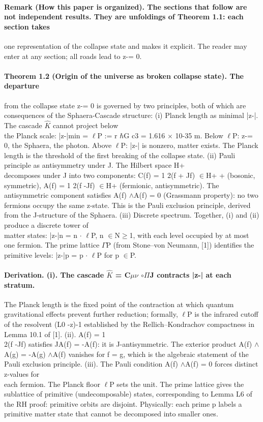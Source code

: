 \paragraph*{Remark (How this paper is organized). The sections that follow are not independent results. They are unfoldings of Theorem 1.1: each section takes}
one representation of the collapse state and makes it explicit. The reader may enter at any section; all roads lead to z-= 0.
\paragraph*{Theorem 1.2 (Origin of the universe as broken collapse state). The departure}
from the collapse state z-= 0 is governed by two principles, both of which are consequences of the Sphaera-Cascade structure:
(i) Planck length as minimal |z-|. The cascade $\hat K$ cannot project below\\
the Planck scale: |z-|min = $\ell$P := r $\hbar$G c3 = 1.616 $\times$ 10-35 m. Below $\ell$P: z-= 0, the Sphaera, the photon. Above $\ell$P: |z-| is nonzero, matter exists. The Planck length is the threshold of the first breaking of the collapse state.
(ii) Pauli principle as antisymmetry under J. The Hilbert space H+\\
decomposes under J into two components: C(f) = 1 2(f + Jf) $\in$H+ + (bosonic, symmetric), A(f) = 1 2(f -Jf) $\in$H+ (fermionic, antisymmetric). The antisymmetric component satisfies A(f) $\wedge$A(f) = 0 (Grassmann property): no two fermions occupy the same z-state. This is the Pauli exclusion principle, derived from the J-structure of the Sphaera.
(iii) Discrete spectrum. Together, (i) and (ii) produce a discrete tower of\\
matter states: |z-|n = n $\cdot$ $\ell$P, n $\in$N$\geq$1, with each level occupied by at most one fermion. The prime lattice $\Gamma$P (from Stone--von Neumann, [1]) identifies the primitive levels: |z-|p = p $\cdot$ $\ell$P for p $\in$P.
\paragraph*{Derivation. (i). The cascade $\hat K$ = C$\mu$$\nu$ $\circ$$\Pi$J contracts |z-| at each stratum.}
The Planck length is the fixed point of the contraction at which quantum gravitational effects prevent further reduction; formally, $\ell$P is the infrared cutoff of the resolvent (L0 -z)-1 established by the Rellich--Kondrachov compactness in Lemma 10.1 of [1].
(ii). A(f) = 1\\
2(f -Jf) satisfies JA(f) = -A(f): it is J-antisymmetric. The exterior product A(f) $\wedge$A(g) = -A(g) $\wedge$A(f) vanishes for f = g, which is the algebraic statement of the Pauli exclusion principle.
(iii). The Pauli condition A(f) $\wedge$A(f) = 0 forces distinct z-values for\\
each fermion. The Planck floor $\ell$P sets the unit. The prime lattice gives the sublattice of primitive (undecomposable) states, corresponding to Lemma L6
of the RH proof: primitive orbits are disjoint. Physically: each prime p labels a primitive matter state that cannot be decomposed into smaller ones.
